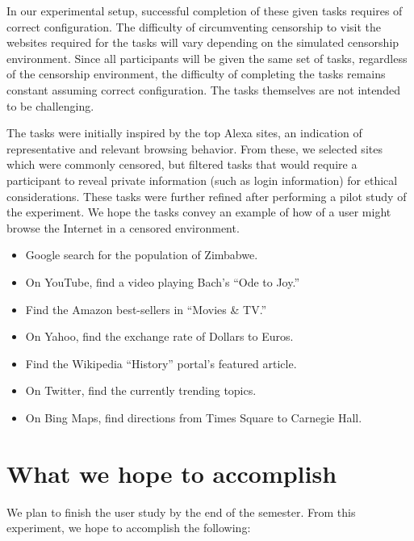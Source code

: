 \documentclass{template}
\begin{document}
In our experimental setup, successful completion of 
these given tasks requires of correct configuration.
The difficulty of circumventing  censorship to visit the 
websites required for the tasks will vary depending on the 
simulated censorship environment. Since all participants will be given the 
same set of tasks, regardless of the censorship environment, 
the difficulty of completing the tasks remains constant assuming
correct configuration. The tasks themselves are not intended to
be challenging.

The tasks were initially inspired by the top Alexa sites, 
an indication of representative and relevant browsing behavior. 
From these, we selected sites which were commonly censored, 
but filtered tasks that would require a participant to reveal private information 
(such as login information) for ethical considerations. These tasks
were further refined after performing a pilot study of the experiment. 
We hope the tasks convey an example of how of a user might 
browse the Internet in a censored environment. 

\begin{itemize} \itemsep1pt \parskip0pt 
\item Google search for the population of Zimbabwe. 
\item On YouTube, find a video playing Bach's ``Ode to Joy.''
\item Find the Amazon best-sellers in ``Movies \& TV.''
\item On Yahoo, find the exchange rate of Dollars to Euros.
\item Find the Wikipedia ``History'' portal's featured article. 
\item On Twitter, find the currently trending topics.
\item On Bing Maps, find directions from Times Square to Carnegie Hall.\\
\end{itemize}


\section{What we hope to accomplish}

We plan to finish the user study by the end of the semester. 
From this experiment, we hope to accomplish the following: 
\end{document}

